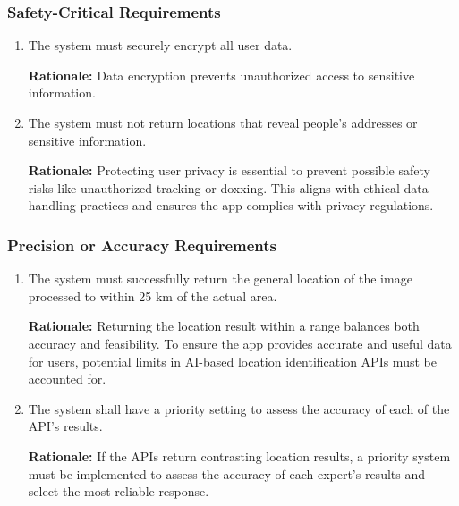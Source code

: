 \documentclass[]{article}
\begin{document}
\subsubsection{Safety-Critical Requirements}
\label{ssub:safety_critical_requirements}
\begin{enumerate}[{PR-SC}1. ]
	\item The system must securely encrypt all user data.
		
	{\bf Rationale:} Data encryption prevents unauthorized access to sensitive information.
	\item The system must not return locations that reveal people's addresses or sensitive information.
	
	{\bf Rationale:} Protecting user privacy is essential to prevent possible safety risks like unauthorized tracking or doxxing. This aligns with ethical data handling practices and ensures the app complies with privacy regulations.
\end{enumerate}

\subsubsection{Precision or Accuracy Requirements}
\label{ssub:precision_or_accuracy_requirements}
\begin{enumerate}[{PR-PA}1. ]
	\item The system must successfully return the general location of the image processed to within 25 km of the actual area.
		
	{\bf Rationale:} Returning the location result within a range balances both accuracy and feasibility. To ensure the app provides accurate and useful data for users, potential limits in AI-based location identification APIs must be accounted for.
	\item The system shall have a priority setting to assess the accuracy of each of the API's results.
	
	{\bf Rationale:} If the APIs return contrasting location results, a priority system must be implemented to assess the accuracy of each expert's results and select the most reliable response.
\end{enumerate}
\end{document}
